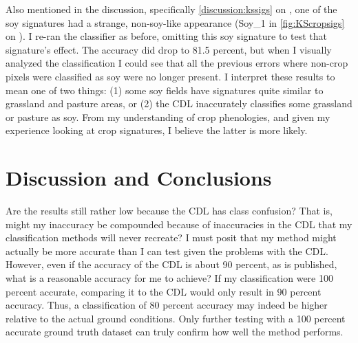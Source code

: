 Also mentioned in the discussion, specifically \autoref{discussion:kssigs} on , one of the soy signatures had a strange, non-soy-like appearance (Soy\_1 in \cref{fig:KScropsigs} on ). I re-ran the classifier as before, omitting this soy signature to test that signature's effect. The accuracy did drop to 81.5 percent, but when I visually analyzed the classification I could see that all the previous errors where non-crop pixels were classified as soy were no longer present. I interpret these results to mean one of two things: (1) some soy fields have signatures quite similar to grassland and pasture areas, or (2) the CDL inaccurately classifies some grassland or pasture as soy. From my understanding of crop phenologies, and given my experience looking at crop signatures, I believe the latter is more likely.


\section{Discussion and Conclusions}

Are the results still rather low because the CDL has class confusion? That is, might my inaccuracy be compounded because of inaccuracies in the CDL that my classification methods will never recreate? I must posit that my method might actually be more accurate than I can test given the problems with the CDL. However, even if the accuracy of the CDL is about 90 percent, as is published, what is a reasonable accuracy for me to achieve? If my classification were 100 percent accurate, comparing it to the CDL would only result in 90 percent accuracy. Thus, a classification of 80 percent accuracy may indeed be higher relative to the actual ground conditions. Only further testing with a 100 percent accurate ground truth dataset can truly confirm how well the method performs.